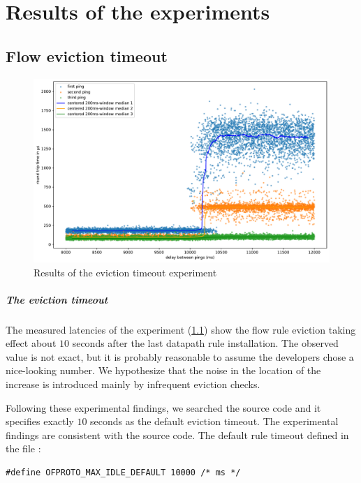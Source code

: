 \chapter{Results of the experiments}
\label{chap:exp}

\section{Flow eviction timeout}
\label{res:eviction-timeout}

\begin{figure}
    \centering
    \includegraphics[width=.9\linewidth]{img/randomized_eviction_timeout.pdf}
    \caption{Results of the eviction timeout experiment}
    \label{fig:plot-eviction-timeout}
\end{figure}

\paragraph{The eviction timeout} The measured latencies of the experiment (\cref{fig:plot-eviction-timeout}) show the flow rule eviction taking effect about $10$ seconds after the last datapath rule installation. The observed value is not exact, but it is probably reasonable to assume the developers chose a nice-looking number. We hypothesize that the noise in the location of the increase is introduced mainly by infrequent eviction checks.

Following these experimental findings, we searched the source code and it specifies exactly $10$ seconds as the default eviction timeout. The experimental findings are consistent with the source code. The default rule timeout defined in the file :
\begin{verbatim}
#define OFPROTO_MAX_IDLE_DEFAULT 10000 /* ms */
\end{verbatim}

